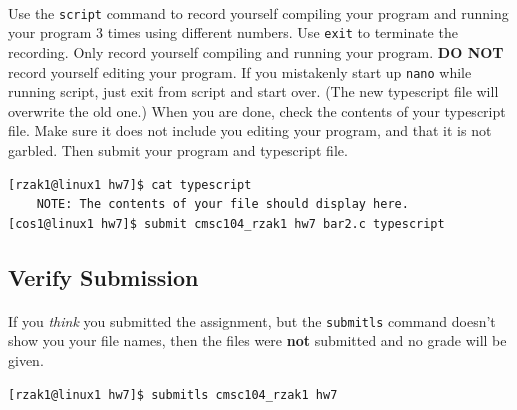 \documentclass[letter,11pt]{article}
\begin{document}
\paragraph{}Use the \texttt{script} command to record yourself compiling your program and running your program 3 times using different numbers. Use \texttt{exit} to terminate the recording. Only record yourself compiling and running your program. \textbf{DO NOT} record yourself editing your program. If you mistakenly start up \texttt{nano} while running script, just exit from script and start over. (The new typescript file will overwrite the old one.) When you are done, check the contents of your typescript file. Make sure it does not include you editing your program, and that it is not garbled. Then submit your program and typescript file.
\begin{verbatim}
[rzak1@linux1 hw7]$ cat typescript
    NOTE: The contents of your file should display here.
[cos1@linux1 hw7]$ submit cmsc104_rzak1 hw7 bar2.c typescript
\end{verbatim}

\subsection*{Verify Submission}
\paragraph{}If you \textit{think} you submitted the assignment, but the \texttt{submitls} command doesn't show you your file names, then the files were \textbf{not} submitted and no grade will be given.
\begin{verbatim}
[rzak1@linux1 hw7]$ submitls cmsc104_rzak1 hw7
\end{verbatim}
\end{document}
